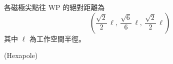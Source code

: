 \documentclass[12pt,a4paper]{article}
\begin{document}
各磁極尖點往 WP 的絕對距離為
\[
\left( \frac{\sqrt{2}}{2}\,\ell,\ \frac{\sqrt{6}}{6}\,\ell,\ \frac{\sqrt{2}}{2}\,\ell \right)
\]
其中 $\ell$ 為工作空間半徑。

\bigskip

(Hexapole)
\end{document}
